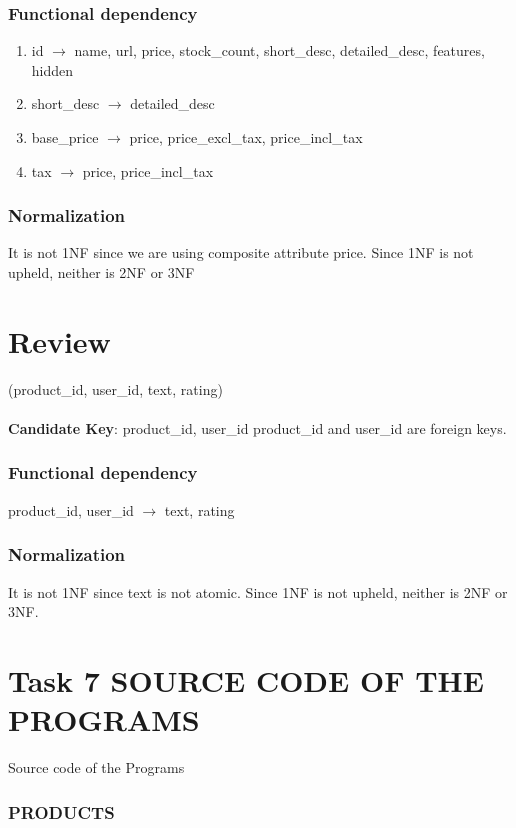 \documentclass{article}
\begin{document}
\subsubsection*{Functional dependency}
\begin{enumerate}[$\bullet$]
\item
  
id $\rightarrow$ name, url, price, stock\_count, short\_desc, detailed\_desc, features, hidden
\item
short\_desc $\rightarrow$ detailed\_desc

\item
base\_price $\rightarrow$ price, price\_excl\_tax,
price\_incl\_tax

\item
tax  $\rightarrow$ price, price\_incl\_tax
\end{enumerate}
\subsubsection*{Normalization}
It is not 1NF since we are using composite attribute price. Since 1NF is not upheld, neither is 2NF or 3NF


\section{Review}
(product\_id, user\_id, text, rating)\\\\
\textbf{Candidate Key}: {product\_id, user\_id}
product\_id and user\_id are foreign keys.

\subsubsection*{Functional dependency}
product\_id, user\_id $\rightarrow$ text, rating
\subsubsection*{Normalization}
It is not 1NF since text is not atomic. Since 1NF is not upheld, neither is 2NF or 3NF.





\section*{Task 7 SOURCE CODE OF THE PROGRAMS}
Source code of the Programs

\subsubsection*{PRODUCTS}
\end{document}
